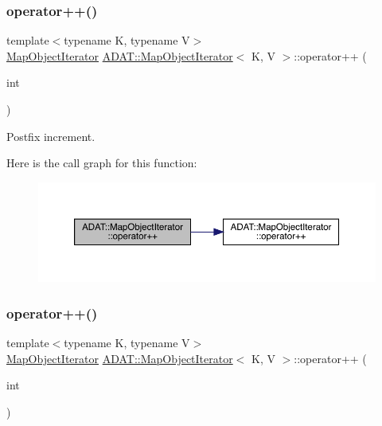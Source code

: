 \subsubsection{\texorpdfstring{operator++()}{operator++()}\hspace{0.1cm}{\footnotesize\ttfamily [3/4]}}
{\footnotesize\ttfamily template$<$typename K, typename V$>$ \\
\mbox{\hyperlink{classADAT_1_1MapObjectIterator}{Map\+Object\+Iterator}} \mbox{\hyperlink{classADAT_1_1MapObjectIterator}{A\+D\+A\+T\+::\+Map\+Object\+Iterator}}$<$ K, V $>$\+::operator++ (\begin{DoxyParamCaption}\item[{int}]{ }\end{DoxyParamCaption})\hspace{0.3cm}{\ttfamily [inline]}}



Postfix increment. 

Here is the call graph for this function\+:
\nopagebreak
\begin{figure}[H]
\begin{center}
\leavevmode
\includegraphics[width=350pt]{d2/d4b/classADAT_1_1MapObjectIterator_a90809a5488988dd0d49ce25df35756ae_cgraph}
\end{center}
\end{figure}
\mbox{\label{classADAT_1_1MapObjectIterator_a90809a5488988dd0d49ce25df35756ae}} 
\subsubsection{\texorpdfstring{operator++()}{operator++()}\hspace{0.1cm}{\footnotesize\ttfamily [4/4]}}
{\footnotesize\ttfamily template$<$typename K, typename V$>$ \\
\mbox{\hyperlink{classADAT_1_1MapObjectIterator}{Map\+Object\+Iterator}} \mbox{\hyperlink{classADAT_1_1MapObjectIterator}{A\+D\+A\+T\+::\+Map\+Object\+Iterator}}$<$ K, V $>$\+::operator++ (\begin{DoxyParamCaption}\item[{int}]{ }\end{DoxyParamCaption})\hspace{0.3cm}{\ttfamily [inline]}}




